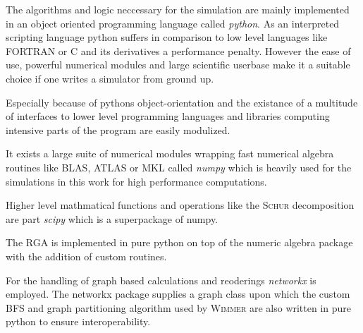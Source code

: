 The algorithms and logic neccessary for the simulation are mainly implemented in an object oriented programming language called \emph{python}.
As an interpreted scripting language python suffers in comparison to low level languages like FORTRAN or C and its derivatives a performance penalty. However the ease of use, powerful numerical modules and large scientific userbase make it a suitable choice if one writes a simulator from ground up.\par
Especially because of pythons object-orientation and the existance of a multitude of interfaces to lower level programming languages and libraries computing intensive parts of the program are easily modulized.\par
It exists a large suite of numerical modules wrapping fast numerical algebra routines like BLAS, ATLAS or MKL called \emph{numpy} \cite{numpy} which is heavily  used for the simulations in this work for high performance computations.\par
Higher level mathmatical functions and operations like the \textsc{Schur} decomposition are part \emph{scipy} \cite{scipy} which is a superpackage of numpy.\par
The RGA is implemented in pure python on top of the numeric algebra package with the addition of custom routines.\par
For the handling of graph based calculations and reoderings \emph{networkx} \cite{networkx} is employed. The networkx package supplies a graph class upon which the custom BFS and graph partitioning algorithm used by \textsc{Wimmer} are also written in pure python to ensure interoperability.
